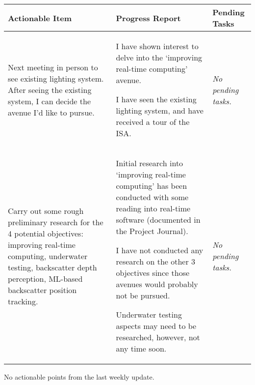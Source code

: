 \begin{table}[!h]
    \centering
    \begin{tabularx}{\textwidth}{|X|X|X|}
        \hline
        Actionable Item & Progress Report & Pending Tasks \\
        \hline
        \hline
        \begin{myitemize}
            \item Next meeting in person to see existing lighting system. After seeing the existing system, I can decide the avenue I'd like to pursue.
        \end{myitemize} & 
        \begin{myitemize}
            \item I have shown interest to delve into the `improving real-time computing' avenue.
            \item I have seen the existing lighting system, and have received a tour of the ISA.
        \end{myitemize} & 
        \begin{myitemize}
            \item \textit{No pending tasks.}
        \end{myitemize} \\
        \hline
        \begin{myitemize}
            \item Carry out some rough preliminary research for the 4 potential objectives: improving real-time computing, underwater testing, backscatter depth perception, ML-based backscatter position tracking.
        \end{myitemize} & 
        \begin{myitemize}
            \item Initial research into `improving real-time computing' has been conducted with some reading into real-time software (documented in the Project Journal).
            \item I have not conducted any research on the other 3 objectives since those avenues would probably not be pursued.
            \item Underwater testing aspects may need to be researched, however, not any time soon.
        \end{myitemize} & 
        \begin{myitemize}
            \item \textit{No pending tasks.}
        \end{myitemize} \\
        \hline
    \end{tabularx}
\end{table}

No actionable points from the last weekly update.